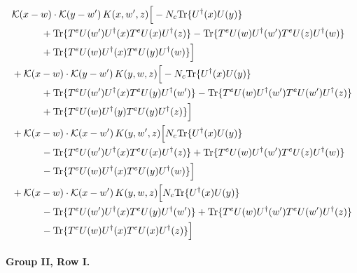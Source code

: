 \documentclass[10pt]{article}
\numberwithin{equation}{section}
\begin{document}
\begin{align}
&\mathcal K(x-w)\cdot\mathcal K(y-w')\,K(x,w',z)\Big[-N_c{\rm Tr}\{U^\dagger(x)U(y)\}\notag\\
&\quad\quad\quad+{\rm Tr}\{T^eU(w')U^\dagger(x)T^eU(x)U^\dagger(z)\}-{\rm Tr}\{T^eU(w)U^\dagger(w')T^eU(z)U^\dagger(w)\}\notag\\
&\quad\quad\quad+{\rm Tr}\{T^eU(w)U^\dagger(x)T^eU(y)U^\dagger(w)\}\Big]\notag\\
&+\mathcal K(x-w)\cdot\mathcal K(y-w')\,K(y,w,z)\Big[-N_c{\rm Tr}\{U^\dagger(x)U(y)\}\notag\\
&\quad\quad\quad+{\rm Tr}\{T^eU(w')U^\dagger(x)T^eU(y)U^\dagger(w')\}-{\rm Tr}\{T^eU(w)U^\dagger(w')T^eU(w')U^\dagger(z)\}\notag\\
&\quad\quad\quad+{\rm Tr}\{T^eU(w)U^\dagger(y)T^eU(y)U^\dagger(z)\}\Big]\notag\\
&+\mathcal K(x-w)\cdot\mathcal K(x-w')\,K(y,w',z)\Big[N_c{\rm Tr}\{U^\dagger(x)U(y)\}\notag\\
&\quad\quad\quad-{\rm Tr}\{T^eU(w')U^\dagger(x)T^eU(x)U^\dagger(z)\}+{\rm Tr}\{T^eU(w)U^\dagger(w')T^eU(z)U^\dagger(w)\}\notag\\
&\quad\quad\quad-{\rm Tr}\{T^eU(w)U^\dagger(x)T^eU(y)U^\dagger(w)\}\Big]\notag\\
&+\mathcal K(x-w)\cdot\mathcal K(x-w')\,K(y,w,z)\Big[N_c{\rm Tr}\{U^\dagger(x)U(y)\}\notag\\
&\quad\quad\quad-{\rm Tr}\{T^eU(w')U^\dagger(x)T^eU(y)U^\dagger(w')\}+{\rm Tr}\{T^eU(w)U^\dagger(w')T^eU(w')U^\dagger(z)\}\notag\\
&\quad\quad\quad-{\rm Tr}\{T^eU(w)U^\dagger(x)T^eU(x)U^\dagger(z)\}\Big]
\label{eq:list12}
\end{align}

\paragraph{Group II, Row I.}
\end{document}
